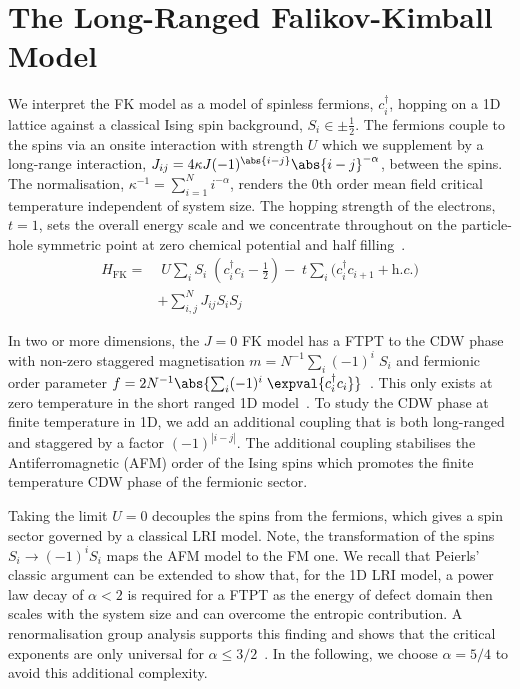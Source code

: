 \section{The Long-Ranged Falikov-Kimball Model}
We interpret the \ac{FK} model as a model of spinless fermions, \(c^\dag_{i}\), hopping on a 1D lattice against a classical Ising spin background, \(S_i \in {\pm \frac{1}{2}}\). The fermions couple to the spins via an onsite interaction with strength \(U\) which we supplement by a long-range interaction, \(J_{ij} = 4\kappa J (-1)^{\abs{i-j}} \abs{i-j}^{-\alpha}\), between the spins. The normalisation, \(\kappa^{-1} = \sum_{i=1}^{N} i^{-\alpha}\), renders the 0th order mean field critical temperature independent of system size. The hopping strength of the electrons, \(t = 1\), sets the overall energy scale and we concentrate throughout on the particle-hole symmetric point at zero chemical potential and half filling~\cite{gruberFalicovKimballModelReview1996}.
~
\begin{align}
H_{\mathrm{FK}} = & \;U \sum_{i} S_i\;(c^\dag_{i}c_{i} - \tfrac{1}{2}) -\;t \sum_{i} (c^\dag_{i}c_{i+1} + \textit{h.c.)}\\ 
 &  + \sum_{i, j}^{N} J_{ij}  S_i S_j \nonumber
\label{eq:HFK}
\end{align}

In two or more dimensions, the \(J\!=0\!\) \ac{FK} model has a \ac{FTPT} to the \ac{CDW} phase with non-zero staggered magnetisation \(m = N^{-1} \sum_i (-1)^i \; S_i\) and fermionic order parameter \(f = 2 N^{-1}\abs{\sum_i (-1)^i \; \expval{c^\dag_{i}c_{i}}}\)~\cite{antipovInteractionTunedAndersonMott2016,maskaThermodynamicsTwodimensionalFalicovKimball2006}. This only exists at zero temperature in the short ranged 1D model~\cite{kennedyItinerantElectronModel1986}. To study the \ac{CDW} phase at finite temperature in 1D, we add an additional coupling that is both long-ranged and staggered by a factor \((-1)^{|i-j|}\). The additional coupling stabilises the Antiferromagnetic (AFM) order of the Ising spins which promotes the finite temperature \ac{CDW} phase of the fermionic sector.

Taking the limit \(U = 0\) decouples the spins from the fermions, which gives a spin sector governed by a classical \ac{LRI} model. Note, the transformation of the spins \(S_i \to (-1)^{i} S_i\) maps the AFM model to the FM one. We recall that Peierls' classic argument can be extended to show that, for the 1D \ac{LRI} model, a power law decay of \(\alpha < 2\) is required for a \ac{FTPT} as the energy of defect domain then scales with the system size and can overcome the entropic contribution. A renormalisation group analysis supports this finding and shows that the critical exponents are only universal for \(\alpha \leq 3/2\)~\cite{ruelleStatisticalMechanicsOnedimensional1968,thoulessLongRangeOrderOneDimensional1969,angeliniRelationsShortrangeLongrange2014}. In the following, we choose \(\alpha = 5/4\) to avoid this additional complexity. 

